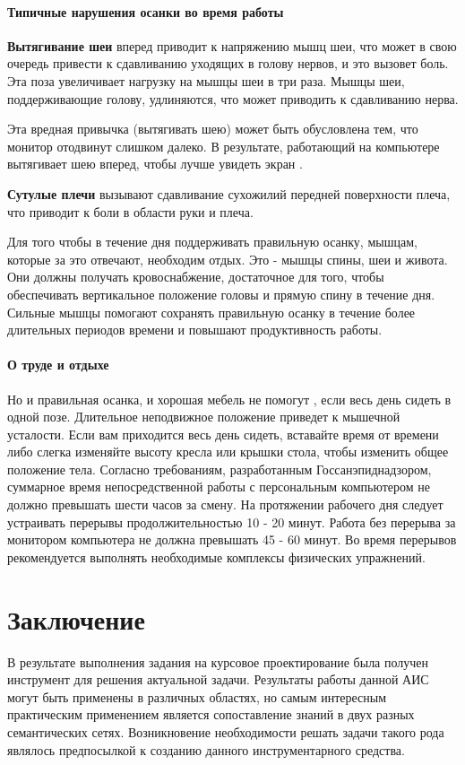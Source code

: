 \documentclass[russian,utf8,emptystyle]{eskdtext}
\begin{document}
\begin{spacing}{1.5}
\paragraph{Типичные нарушения осанки во время работы}
\textbf{Вытягивание шеи} вперед приводит к напряжению мышц шеи, что может в свою очередь привести к сдавливанию уходящих в голову нервов, и это вызовет боль. Эта поза увеличивает нагрузку на мышцы шеи в три раза. Мышцы шеи, поддерживающие голову, удлиняются, что может приводить к сдавливанию нерва.

Эта вредная привычка (вытягивать шею) может быть обусловлена тем, что монитор отодвинут слишком далеко. В результате, работающий на компьютере вытягивает шею вперед, чтобы лучше увидеть экран \cite{Shilova}.

\textbf{Сутулые плечи} вызывают сдавливание сухожилий передней поверхности плеча, что приводит к боли в области руки и плеча.

Для того чтобы в течение дня поддерживать правильную осанку, мышцам, которые за это отвечают, необходим отдых. Это - мышцы спины, шеи и живота. Они должны получать кровоснабжение, достаточное для того, чтобы обеспечивать вертикальное положение головы и прямую спину в течение дня. Сильные мышцы помогают сохранять правильную осанку в течение более длительных периодов времени и повышают продуктивность работы. 

\paragraph{О труде и отдыхе}
Но и правильная осанка, и хорошая мебель не помогут \cite{Shilova}, если весь день сидеть в одной позе. Длительное неподвижное положение приведет к мышечной усталости. Если вам приходится весь день сидеть, вставайте время от времени либо слегка изменяйте высоту кресла или крышки стола, чтобы изменить общее положение тела.
Согласно требованиям, разработанным Госсанэпиднадзором, суммарное время непосредственной работы с персональным компьютером не должно превышать шести часов за смену. На протяжении рабочего дня следует устраивать перерывы продолжительностью 10 - 20 минут. Работа без перерыва за монитором компьютера не должна превышать 45 - 60 минут. Во время перерывов рекомендуется выполнять необходимые комплексы физических упражнений.

\newpage
\section{Заключение}
В результате выполнения задания на курсовое проектирование была получен инструмент для решения актуальной задачи. Результаты работы данной АИС могут быть применены в различных областях, но самым интересным практическим применением является сопоставление знаний в двух разных семантических сетях. Возникновение необходимости решать задачи такого рода являлось предпосылкой к созданию данного инструментарного средства.


\end{spacing}
\end{document}
